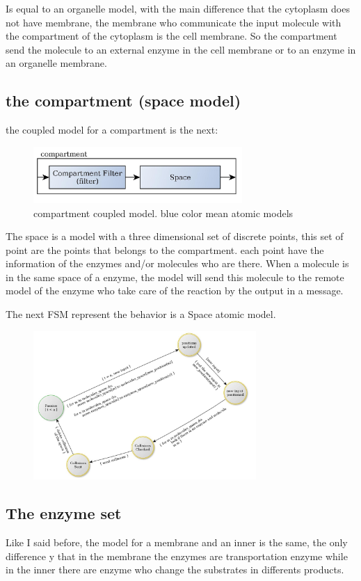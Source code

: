 \documentclass[12pt]{article}
\begin{document}
Is equal to an organelle model, with the main difference that the cytoplasm does not have membrane, the membrane who communicate the input molecule with the compartment of the cytoplasm is the cell membrane. So the compartment send the molecule to an external enzyme in the cell membrane or to an enzyme in an organelle membrane.

\newpage
\subsection*{the compartment (space model)}

the coupled model for a compartment is the next:

\begin{figure}[h!]
 \centering
  \includegraphics[width=300px]{coupled-compartment.jpg}
 \caption{compartment coupled model. blue color mean atomic models}
\end{figure}

The space is a model with a three dimensional set of discrete points, this set of point are the points that belongs to the compartment. each point have the information of the enzymes and/or molecules who are there. When a molecule is in the same space of a enzyme, the model will send this molecule to the remote model of the enzyme who take care of the reaction by the output in a message. 

The next FSM represent the behavior is a Space atomic model.


\begin{figure}[h!]
 \centering
  \includegraphics[width=320px]{atomic-space.jpg}
\end{figure}

\newpage
\subsection*{The enzyme set}
Like I said before, the model for a membrane and an inner is the same, the only difference y that in the membrane the enzymes are transportation enzyme while in the inner there are enzyme who change the substrates in differents products.
\end{document}
